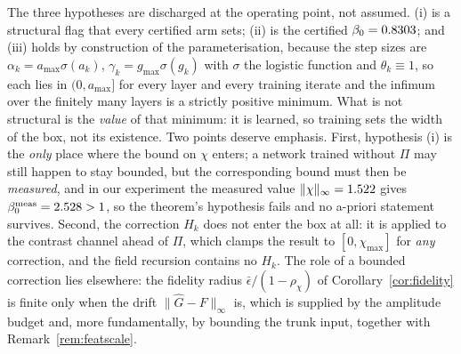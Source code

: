 \documentclass[journal,cmes,article,submit,moreauthors,pdftex]{Definitions/tsp}
\newcommand{\norm}[1]{\lVert #1 \rVert}
\newcommand{\infn}[1]{\lVert #1 \rVert_{\infty}}
\newcommand{\numv}[1]{#1}
\begin{document}
The three hypotheses are discharged at the operating point, not assumed. (i) is a structural flag
that every certified arm sets; (ii) is the certified $\beta_0=\numv{\betacert}$; and (iii) holds by
construction of the parameterisation, because the step sizes are
$\alpha_k=a_{\max}\sigma(a_k)$, $\gamma_k=g_{\max}\sigma(g_k)$ with $\sigma$ the logistic function
and $\theta_k\equiv1$, so each lies in $(0,a_{\max}]$ for every layer and every training iterate and
the infimum over the finitely many layers is a strictly positive minimum. What is not structural is
the \emph{value} of that minimum: it is learned, so training sets the width of the box, not its
existence.
Two points deserve emphasis. First, hypothesis (i) is the
\emph{only} place where the bound on $\chi$ enters; a network trained without $\Pi$ may still happen
to stay bounded, but the corresponding bound must then be \emph{measured}, and in our experiment the
measured value $\infn{\chi}=\numv{\NumMeasChiNoProj}$ gives
$\beta_0^{\mathrm{meas}}=\numv{\NumBetaMeas}>1$, so the theorem's hypothesis fails and no a-priori
statement survives. Second, the correction $H_k$ does not enter the box at all: it is applied to the contrast channel
ahead of $\Pi$, which clamps the result to $[0,\chi_{\max}]$ for \emph{any} correction, and the field
recursion contains no $H_k$. The role of a bounded correction lies elsewhere: the fidelity radius
$\bar\epsilon/(1-\rho_\chi)$ of Corollary~\ref{cor:fidelity} is finite only when the drift
$\norm{\hat G-F}_\infty$ is, which is supplied by the amplitude budget and, more fundamentally, by
bounding the trunk input, together with Remark~\ref{rem:featscale}.
\end{document}
